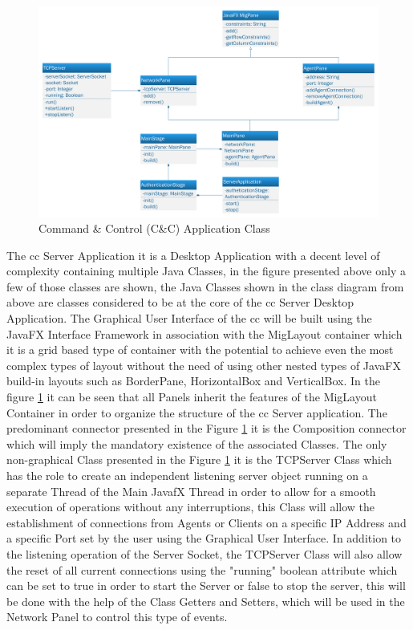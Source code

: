 \begin{figure}[h]
    \centering
    \includegraphics[width=1.0\textwidth]{images/command-control-class-diagram.pdf}
    \captionsetup{justification=centering}
    \caption[Command \& Control Class]{Command \& Control (C\&C) Application Class}
    \label{fig:command-class}
\end{figure}

The \acrfull{cc} Server Application it is a Desktop Application with a decent level of
complexity containing multiple Java Classes, in the figure presented above only a few of
those classes are shown, the Java Classes shown in the class diagram from above are classes
considered to be at the core of the \acrfull{cc} Server Desktop Application. The Graphical User
Interface of the \acrfull{cc} will be built using the JavaFX Interface Framework in association
with the MigLayout container which it is a grid based type of container with the potential to
achieve even the most complex types of layout without the need of using other nested types of
JavaFX build-in layouts such as BorderPane, HorizontalBox and VerticalBox. In the
figure \ref{fig:command-class} it can be seen that all Panels inherit the features
of the MigLayout Container in order to organize the structure of the \acrfull{cc} Server
application. The predominant connector presented in the Figure \ref{fig:command-class}
it is the Composition connector which will imply the mandatory existence of the associated
Classes. The only non-graphical Class presented in the Figure \ref{fig:command-class} it is
the TCPServer Class which has the role to create an independent listening server object
running on a separate Thread of the Main JavafX Thread in order to allow for a smooth
execution of operations without any interruptions, this Class will allow the establishment
of connections from Agents or Clients on a specific IP Address and a specific Port set by
the user using the Graphical User Interface. In addition to the listening operation of
the Server Socket, the TCPServer Class will also allow the reset of all current connections
using the "running" boolean attribute which can be set to true in order to start the
Server or false to stop the server, this will be done with the help of the Class Getters
and Setters, which will be used in the Network Panel to control this type of events.

